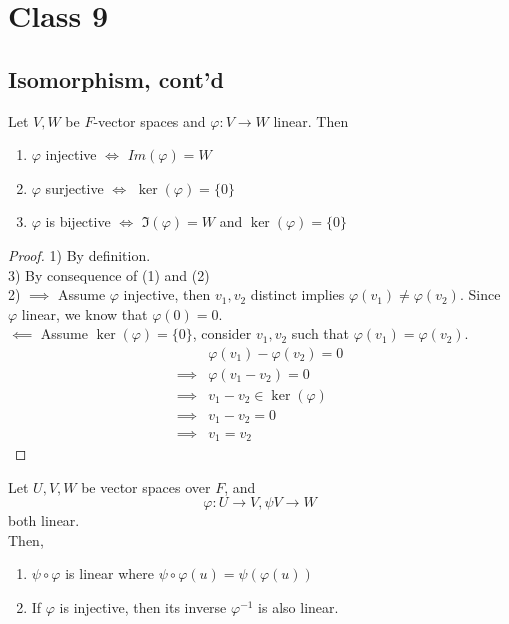 \section{Class 9} 

\subsection{Isomorphism, cont'd}

\begin{proposition}
    Let $V, W$ be $F$-vector spaces and $\varphi: V \to W$ linear. Then 
    \begin{enumerate}
        \item $\varphi$ injective $\iff$ $Im(\varphi) = W$
        \item $\varphi$ surjective $\iff$ $\ker(\varphi) = \{ 0 \} $
        \item $\varphi$ is bijective $\iff$ $\Im(\varphi) = W$ and $\ker(\varphi) = \{ 0 \} $
    \end{enumerate} 
\end{proposition}

\begin{proof}

    1) By definition. \\

    3) By consequence of (1) and (2) \\

    2) $\implies$ Assume $\varphi$ injective, then $v_1, v_2$ distinct implies $\varphi(v_1) \neq \varphi(v_2)$. Since $\varphi$ linear, we know that $\varphi(0) = 0$. \\

    $\impliedby$ Assume $\ker(\varphi) = \{ 0 \} $, consider $v_1, v_2$ such that $\varphi(v_1) = \varphi(v_2)$. 
    \begin{align*}
        & \varphi(v_1) - \varphi(v_2) = 0 \\
        \implies & \varphi(v_1 - v_2) = 0 \\
        \implies & v_1 - v_2 \in \ker(\varphi) \\
        \implies & v_1 - v_2 = 0 \\
        \implies & v_1 = v_2
    \end{align*}
\end{proof}

\begin{proposition}
    Let $U, V, W$ be vector spaces over $F$, and 
    \[
        \varphi: U \to V, \psi V \to W
    \]
    both linear. \\

    Then, 
    \begin{enumerate}
        \item $\psi \circ \varphi$ is linear where $\psi \circ \varphi(u) = \psi( \varphi(u))$ 
        \item If $\varphi$ is injective, then its inverse $\varphi^{-1}$ is also linear. 
    \end{enumerate}
\end{proposition}

